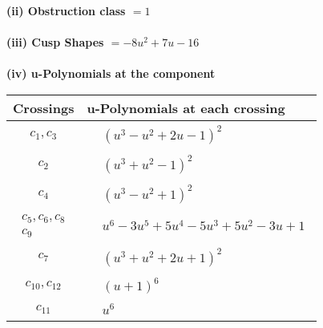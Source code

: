 \documentclass[1p]{elsarticle_modified}
\theoremstyle{definition}
\begin{document}
\flushleft \textbf{(ii) Obstruction class $= 1$}\\~\\
\flushleft \textbf{(iii) Cusp Shapes $= -8 u^2+7 u-16$}\\~\\
\newpage\renewcommand{\arraystretch}{1}
\flushleft \textbf{(iv) u-Polynomials at the component}\newline \\
\begin{tabular}{m{50pt}|m{274pt}}
Crossings & \hspace{64pt}u-Polynomials at each crossing \\
\hline $$\begin{aligned}c_{1},c_{3}\end{aligned}$$&$\begin{aligned}
&(u^3- u^2+2 u-1)^2
\end{aligned}$\\
\hline $$\begin{aligned}c_{2}\end{aligned}$$&$\begin{aligned}
&(u^3+u^2-1)^2
\end{aligned}$\\
\hline $$\begin{aligned}c_{4}\end{aligned}$$&$\begin{aligned}
&(u^3- u^2+1)^2
\end{aligned}$\\
\hline $$\begin{aligned}c_{5},c_{6},c_{8}\\c_{9}\end{aligned}$$&$\begin{aligned}
&u^6-3 u^5+5 u^4-5 u^3+5 u^2-3 u+1
\end{aligned}$\\
\hline $$\begin{aligned}c_{7}\end{aligned}$$&$\begin{aligned}
&(u^3+u^2+2 u+1)^2
\end{aligned}$\\
\hline $$\begin{aligned}c_{10},c_{12}\end{aligned}$$&$\begin{aligned}
&(u+1)^6
\end{aligned}$\\
\hline $$\begin{aligned}c_{11}\end{aligned}$$&$\begin{aligned}
&u^6
\end{aligned}$\\
\hline
\end{tabular}\\~\\
\end{document}
